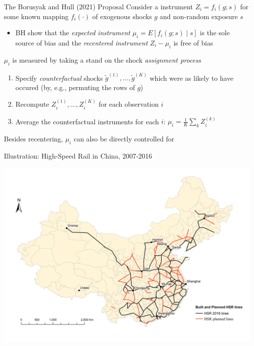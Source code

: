 \documentclass{beamer}
\begin{document}
\begin{frame}{The Borusyak and Hull (2021) Proposal}
Consider a instrument $Z_i=f_i(g;s)$ for some known mapping $f_i(\cdot)$ of exogenous shocks $g$ and non-random exposure $s$\smallskip
\begin{itemize}
\item BH show that the \emph{expected instrument} $\mu_i=E[f_i(g;s)\mid s]$ is the sole source of bias and the \emph{recentered instrument} $Z_i-\mu_i$ is free of bias
\end{itemize}\medskip\pause{}

$\mu_i$ is measured by taking a stand on the shock \emph{assignment process}\smallskip\pause{}
\begin{enumerate}
\item Specify \emph{counterfactual} shocks $\tilde{g}^{(1)},\dots,\tilde{g}^{(K)}$ which were as likely to have occured (by, e.g., permuting the rows of $g$)\smallskip\pause{}
\item Recompute $Z_i^{(1)},\dots,Z_i^{(K)}$ for each observation $i$\smallskip\pause{}
\item Average the counterfactual instruments for each $i$: $\mu_i=\frac{1}{K}\sum_k Z_i^{(k)}$
\end{enumerate}\medskip\pause{}

Besides recentering, $\mu_i$ can also be directly controlled for

\end{frame}

\begin{frame}{Illustration: High-Speed Rail in China, 2007-2016}
\vspace{-1cm}
\begin{center}
\includegraphics[scale=0.4]{./lecture_includes/Lines_actual_planned.png}
\end{center}

\end{frame}
\end{document}
